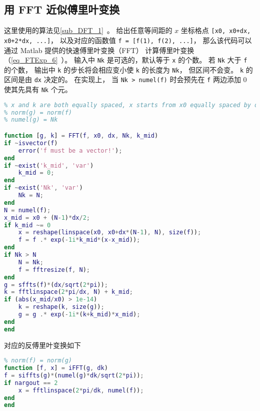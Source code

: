 \subsection{用 FFT 近似傅里叶变换}
这里使用的算法见\autoref{sub_DFT_1}~。 给出任意等间距的 $x$ 坐标格点 \verb|[x0, x0+dx, x0+2*dx, ...]|， 以及对应的函数值 \verb|f = [f(1), f(2), ...]|， 那么该代码可以通过 Matlab 提供的快速傅里叶变换（FFT） 计算傅里叶变换（\autoref{eq_FTExp_6}~）。 输入中 \verb|Nk| 是可选的，默认等于 \verb|x| 的个数。 若 \verb|Nk| 大于 \verb|f| 的个数， 输出中 \verb|k| 的步长将会相应变小使 \verb|k| 的长度为 \verb|Nk|， 但区间不会变。 \verb|k| 的区间是由 \verb|dx| 决定的。 在实现上， 当 \verb|Nk > numel(f)| 时会预先在 \verb|f| 两边添加 0 使其先具有 \verb|Nk| 个元。
\begin{lstlisting}[language=matlab, caption=FFT.m]
% fft approximation of the analytical fourier transform from f(x) to g(k)
% x and k are both equally spaced, x starts from x0 equally spaced by dx
% norm(g) = norm(f)
% numel(g) = Nk

function [g, k] = FFT(f, x0, dx, Nk, k_mid)
if ~isvector(f)
    error('f must be a vector!');
end
if ~exist('k_mid', 'var')
    k_mid = 0;
end
if ~exist('Nk', 'var')
    Nk = N;
end
N = numel(f);
x_mid = x0 + (N-1)*dx/2;
if k_mid ~= 0
    x = reshape(linspace(x0, x0+dx*(N-1), N), size(f));
    f = f .* exp(-1i*k_mid*(x-x_mid));
end
if Nk > N
    N = Nk;
    f = fftresize(f, N);
end
g = sffts(f)*(dx/sqrt(2*pi));
k = fftlinspace(2*pi/dx, N) + k_mid;
if (abs(x_mid/x0) > 1e-14)
    k = reshape(k, size(g));
    g = g .* exp(-1i*(k+k_mid)*x_mid);
end
end
\end{lstlisting}
对应的反傅里叶变换如下
\begin{lstlisting}[language=matlab, caption=iFFT.m]
% fft approximation of the analytical inverse fourier transform
% norm(f) = norm(g)
function [f, x] = iFFT(g, dk)
f = siffts(g)*(numel(g)*dk/sqrt(2*pi));
if nargout == 2
    x = fftlinspace(2*pi/dk, numel(f));
end
end
\end{lstlisting}

